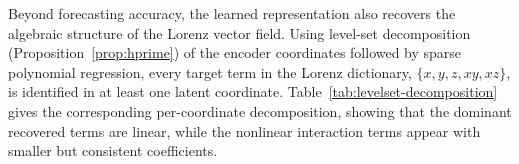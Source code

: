 \documentclass{article}
\begin{document}
Beyond forecasting accuracy, the learned representation also recovers the algebraic structure of the Lorenz vector field. Using level-set decomposition (Proposition~\ref{prop:hprime}) of the encoder coordinates followed by sparse polynomial regression, every target term in the Lorenz dictionary, $\{x,y,z,xy,xz\}$, is identified in at least one latent coordinate. Table~\ref{tab:levelset-decomposition} gives the corresponding per-coordinate decomposition, showing that the dominant recovered terms are linear, while the nonlinear interaction terms appear with smaller but consistent coefficients. 
\end{document}
